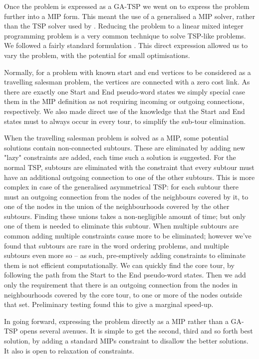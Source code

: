 \documentclass[11pt]{article}
\theoremstyle{plain}
\theoremstyle{definition}
\begin{document}
Once the problem is expressed as a GA-TSP we went on to express the problem further into a MIP form. This meant the use of a generalised a MIP solver, rather than the TSP solver used by \textcite{Horvat2014}. Reducing the problem to a linear mixed integer programming problem is a very common technique to solve TSP-like problems. We followed a fairly standard formulation . This direct expression allowed us to vary the problem, with the potential for small optimisations. 


Normally, for a problem with known start and end vertices to be considered as a travelling salesman problem, the vertices are connected with a zero cost link. As there are exactly one Start and End pseudo-word states we simply special case them in the MIP definition as not requiring incoming or outgoing connections, respectively. We also made direct use of the knowledge that the Start and End states must to always occur in every tour, to simplify the sub-tour elimination. 

When the travelling salesman problem is solved as a MIP,  some potential solutions contain non-connected subtours. These are eliminated by adding new "lazy" constraints are added, each time such a solution is suggested. For the normal TSP, subtours are eliminated with the constraint that every subtour must have an additional outgoing connection to one of the other subtours. This is more complex in case of the generalised asymmetrical TSP: for each subtour there must an outgoing connection from the nodes of the neighbours covered by it, to one of the nodes in the union of the neighbourhoods covered by the other subtours. Finding these unions takes a non-negligible amount of time; but only one of them is needed to eliminate this subtour. When multiple subtours are common adding multiple constraints cause more to be eliminated; however we've found that subtours are rare in the word ordering problems, and multiple subtours even more so -- as such, pre-emptively adding constraints to eliminate them is not efficient computationally. We can quickly find the core tour, by following the path from the Start to the End pseudo-word states. Then we add only the requirement that there is an outgoing connection from the nodes in neighbourhoods covered by the core tour, to one or more of the nodes outside that set. Preliminary testing found this to give a marginal speed-up.

In going forward, expressing the problem directly as a MIP rather than a GA-TSP opens several avenues. It is simple to get the second, third and so forth best solution, by adding a standard MIPs constraint to disallow the better solutions. It also is open to relaxation of constraints. 
\end{document}
